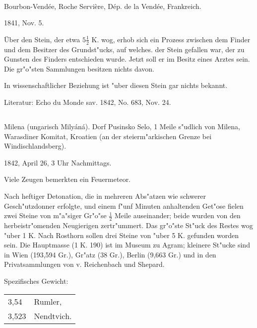 \documentclass[a4paper, 11pt, oneside]{article}
\begin{document}
\paragraph{}
Bourbon-Vendée, Roche Servière, Dép. de la Vendée, Frankreich.

1841, Nov. 5.

Über den Stein, der etwa $\mathfrak{5\frac{1}{2}}$ K. wog, erhob sich ein Prozess zwischen dem Finder und dem Besitzer des Grundst"ucks, auf welches. der Stein gefallen war, der zu Gunsten des Finders entschieden wurde. Jetzt soll er im Besitz eines Arztes sein. Die gr"o"sten Sammlungen besitzen nichts davon.

In wissenschaftlicher Beziehung ist "uber diesen Stein gar nichts bekannt.

\normalsize
Literatur: Echo du Monde sav. 1842, No. 683, Nov. 24.

\subsection{}
\LARGE
\paragraph{}
Milena (ungarisch Milyáná). Dorf Pusinsko Selo, 1 Meile s"udlich von Milena, Warasdiner Komitat, Kroatien (an der steierm"arkischen Grenze bei Windischlandsberg).

1842, April 26, 3 Uhr Nachmittags.

Viele Zeugen bemerkten ein Feuermeteor.

Nach heftiger Detonation, die in mehreren Abs"atzen wie schwerer Gesch"utzdonner erfolgte, und einem f"unf Minuten anhaltenden Get"ose fielen zwei Steine von m"a"siger Gr"o"se $\mathfrak{\frac{1}{2}}$ Meile auseinander; beide wurden von den herbeistr"omenden Neugierigen zertr"ummert. Das gr"o"ste St"uck des Restes wog "uber 1 K. Nach Rosthorn sollen drei Steine von "uber 5 K. gefunden worden sein. Die Hauptmasse (1 K. 190) ist im Museum zu Agram; kleinere St"ucke sind in Wien (193,594 Gr.), Gr"atz (38 Gr.), Berlin (9,663 Gr.) und in den Privatsammlungen von v. Reichenbach und Shepard.

Spezifisches Gewicht:  
\begin{table}[!ht]
    \centering\swabfamily\Large
    \begin{tabular}{l l}
        3,54 & Rumler,\\
        3,523 & Nendtvich.
    \end{tabular}
\end{table}
\end{document}
